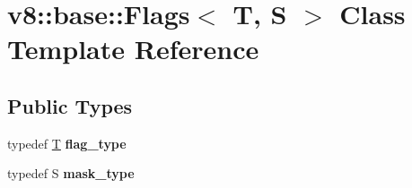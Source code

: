 \hypertarget{classv8_1_1base_1_1Flags}{}\section{v8\+:\+:base\+:\+:Flags$<$ T, S $>$ Class Template Reference}
\label{classv8_1_1base_1_1Flags}
\subsection*{Public Types}
\begin{DoxyCompactItemize}
\item 
\mbox{\label{classv8_1_1base_1_1Flags_addb5d52df9e4f8d7d213a0532a65bfd0}} 
typedef \mbox{\hyperlink{classv8_1_1internal_1_1torque_1_1T}{T}} {\bfseries flag\+\_\+type}
\item 
\mbox{\label{classv8_1_1base_1_1Flags_aa53705f3746713ebecde6280deef2973}} 
typedef S {\bfseries mask\+\_\+type}
\end{DoxyCompactItemize}
